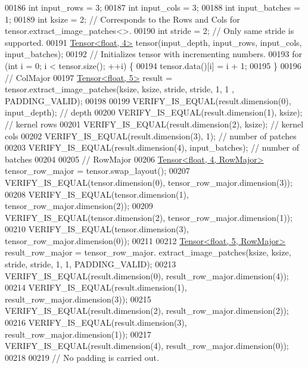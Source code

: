 \begin{DoxyCode}
00186   \textcolor{keywordtype}{int} input\_rows = 3;
00187   \textcolor{keywordtype}{int} input\_cols = 3;
00188   \textcolor{keywordtype}{int} input\_batches = 1;
00189   \textcolor{keywordtype}{int} ksize = 2;  \textcolor{comment}{// Corresponds to the Rows and Cols for tensor.extract\_image\_patches<>.}
00190   \textcolor{keywordtype}{int} stride = 2;  \textcolor{comment}{// Only same stride is supported.}
00191   \hyperlink{class_eigen_1_1_tensor}{Tensor<float, 4>} tensor(input\_depth, input\_rows, input\_cols, input\_batches);
00192   \textcolor{comment}{// Initializes tensor with incrementing numbers.}
00193   \textcolor{keywordflow}{for} (\textcolor{keywordtype}{int} i = 0; i < tensor.size(); ++i) \{
00194     tensor.data()[i] = i + 1;
00195   \}
00196   \textcolor{comment}{// ColMajor}
00197   \hyperlink{class_eigen_1_1_tensor}{Tensor<float, 5>} result = tensor.extract\_image\_patches(ksize, ksize, stride, stride, 1, 1
      , PADDING\_VALID);
00198 
00199   VERIFY\_IS\_EQUAL(result.dimension(0), input\_depth);  \textcolor{comment}{// depth}
00200   VERIFY\_IS\_EQUAL(result.dimension(1), ksize);  \textcolor{comment}{// kernel rows}
00201   VERIFY\_IS\_EQUAL(result.dimension(2), ksize);  \textcolor{comment}{// kernel cols}
00202   VERIFY\_IS\_EQUAL(result.dimension(3), 1);  \textcolor{comment}{// number of patches}
00203   VERIFY\_IS\_EQUAL(result.dimension(4), input\_batches);  \textcolor{comment}{// number of batches}
00204 
00205   \textcolor{comment}{// RowMajor}
00206   \hyperlink{class_eigen_1_1_tensor}{Tensor<float, 4, RowMajor>} tensor\_row\_major = tensor.swap\_layout();
00207   VERIFY\_IS\_EQUAL(tensor.dimension(0), tensor\_row\_major.dimension(3));
00208   VERIFY\_IS\_EQUAL(tensor.dimension(1), tensor\_row\_major.dimension(2));
00209   VERIFY\_IS\_EQUAL(tensor.dimension(2), tensor\_row\_major.dimension(1));
00210   VERIFY\_IS\_EQUAL(tensor.dimension(3), tensor\_row\_major.dimension(0));
00211 
00212   \hyperlink{class_eigen_1_1_tensor}{Tensor<float, 5, RowMajor>} result\_row\_major = tensor\_row\_major.
      extract\_image\_patches(ksize, ksize, stride, stride, 1, 1, PADDING\_VALID);
00213   VERIFY\_IS\_EQUAL(result.dimension(0), result\_row\_major.dimension(4));
00214   VERIFY\_IS\_EQUAL(result.dimension(1), result\_row\_major.dimension(3));
00215   VERIFY\_IS\_EQUAL(result.dimension(2), result\_row\_major.dimension(2));
00216   VERIFY\_IS\_EQUAL(result.dimension(3), result\_row\_major.dimension(1));
00217   VERIFY\_IS\_EQUAL(result.dimension(4), result\_row\_major.dimension(0));
00218 
00219   \textcolor{comment}{// No padding is carried out.}

\end{DoxyCode}
